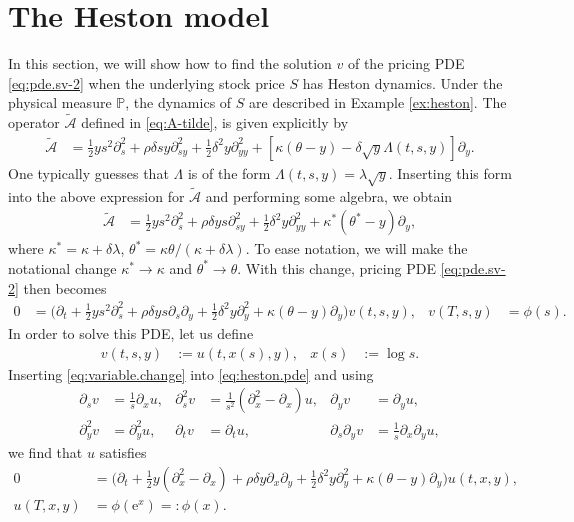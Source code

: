 \documentclass[12pt]{book}
\let\varphi\phi
\numberwithin{equation}{chapter}
\theoremstyle{plain}
\numberwithin{theorem}{section}
\theoremstyle{definition}
\numberwithin{exercise}{chapter}
\newcommand{\<}{\langle}
\renewcommand{\>}{\rangle}
\renewcommand{\(}{\left(}
\renewcommand{\)}{\right)}
\renewcommand{\[}{\left[}
\renewcommand{\]}{\right]}
\newcommand\Pb{\mathds{P}}
\newcommand\Ac{\mathscr{A}}
\newcommand\Lam{\Lambda}
\newcommand\lam{\lambda}
\newcommand\del{\delta}
\newcommand\Act{\widetilde{\Ac}}
\renewcommand\d{\partial}
\newcommand\ee{\mathrm{e}}
\theoremstyle{definition}
\numberwithin{question}{section}
\begin{document}
\section{The Heston model}
In this section, we will show how to find the solution $v$ of the pricing PDE \eqref{eq:pde.sv-2} when the underlying stock price $S$ has Heston dynamics.
Under the physical measure $\Pb$, the dynamics of $S$ are described in Example \ref{ex:heston}.
The operator $\Act$ defined in \eqref{eq:A-tilde}, is given explicitly by
\begin{align}
\Act 
	&= \frac{1}{2} y s^2 \d_s^2 + \rho \del s y \d_{sy}^2 + \frac{1}{2} \del^2 y \d_{yy}^2 + \[ \kappa(\theta - y) - \delta \sqrt{y} \Lambda(t,s,y) \] \d_y .
\end{align}
One typically guesses that $\Lam$ is of the form $\Lam(t,s,y) = \lam \sqrt{y}$.  Inserting this form into the above expression for $\Act$ and performing some algebra, we obtain
\begin{align}
\Act
	&= \frac{1}{2} y s^2 \d_s^2 + \rho \del y s \d_{sy}^2 + \frac{1}{2} \delta^2 y \d_{yy}^2 + \kappa^* (\theta^* - y) \d_y, \label{eq:heston.A}
\end{align}
where $\kappa^* = \kappa + \delta \lambda$, $\theta^* = \kappa \theta / (\kappa + \delta \lambda)$.
To ease notation, we will make the notational change $\kappa^* \to \kappa$ and $\theta^* \to \theta$.
With this change, pricing PDE \eqref{eq:pde.sv-2} then becomes
\begin{align}
0
	&=	\Big (\d_t + \frac{1}{2} y s^2 \d_s^2 + \rho \del y s \d_s \d_y + \frac{1}{2} \delta^2 y \d_y^2 + \kappa (\theta - y) \d_y \Big) v(t,s,y) , &
v(T,s,y)
	&=	\phi(s) . \label{eq:heston.pde}
\end{align}
In order to solve this PDE, let us define
\begin{align}
v(t,s,y)
	&:=	u(t,x(s),y) , &
x(s)
	&:=	\log s . \label{eq:variable.change}
\end{align}
Inserting \eqref{eq:variable.change} into \eqref{eq:heston.pde} and using
\begin{align}
\d_s v
	&=	\frac{1}{s} \d_x u , &
\d_s^2 v
	&=	\frac{1}{s^2} ( \d_x^2 - \d_x ) u , &
\d_y v
	&= \d_y u , \\
\d_y^2 v
	&=	\d_y^2 u , &
\d_t v
	&=	\d_t u , &
\d_s \d_y v
	&=	\frac{1}{s} \d_x \d_y u ,
\end{align}
we find that $u$ satisfies
\begin{align}
0
	&=	\Big (\d_t + \tfrac{1}{2} y (\d_x^2 - \d_x )+ \rho \del y \d_x \d_y + \tfrac{1}{2} \delta^2 y \d_y^2 + \kappa (\theta - y) \d_y \Big) u(t,x,y) ,
	\label{eq:heston.pde.2} \\
u(T,x,y)
	&=	 \phi(\ee^x) =: \varphi(x) . \label{eq:heston.tc.2}
\end{align}
\end{document}
